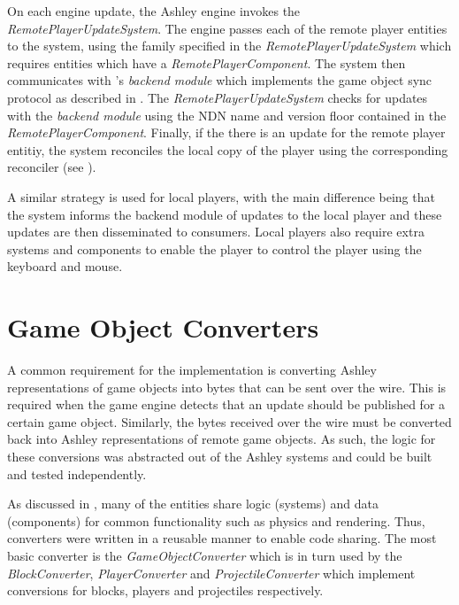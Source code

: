 On each engine update, the Ashley engine invokes the \textit{RemotePlayerUpdateSystem}. The engine passes each of the remote player entities to the system, using the family specified in the \textit{RemotePlayerUpdateSystem} which requires entities which have a \textit{RemotePlayerComponent}. The system then communicates with \game{}'s \textit{backend module} which implements the game object sync protocol as described in . The \textit{RemotePlayerUpdateSystem} checks for updates with the \textit{backend module} using the NDN name and version floor contained in the \textit{RemotePlayerComponent}. Finally, if the there is an update for the remote player entitiy, the system reconciles the local copy of the player using the corresponding reconciler (see ).

A similar strategy is used for local players, with the main difference being that the system informs the backend module of updates to the local player and these updates are then disseminated to consumers. Local players also require extra systems and components to enable the player to control the player using the keyboard and mouse.

\section{Game Object Converters}\label{sec:impl:converters}
A common requirement for the implementation is converting Ashley representations of game objects into bytes that can be sent over the wire. This is required when the game engine detects that an update should be published for a certain game object. Similarly, the bytes received over the wire must be converted back into Ashley representations of remote game objects. As such, the logic for these conversions was abstracted out of the Ashley systems and could be built and tested independently.

As discussed in , many of the entities share logic (systems) and data (components) for common functionality such as physics and rendering. Thus, converters were written in a reusable manner to enable code sharing. The most basic converter is the \textit{GameObjectConverter} which is in turn used by the \textit{BlockConverter}, \textit{PlayerConverter} and \textit{ProjectileConverter} which implement conversions for blocks, players and projectiles respectively. 

